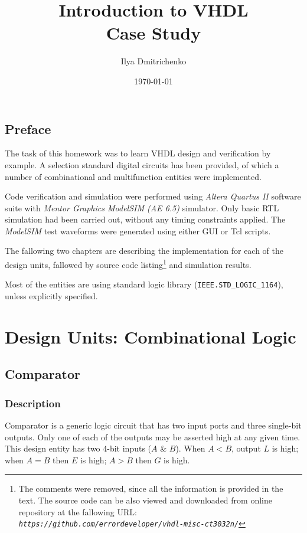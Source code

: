 \documentclass[10pt,a4paper]{report}
\author{Ilya Dmitrichenko}
\title{Introduction to VHDL \\ Case Study}
\date{\today}
\begin{document}
\maketitle

\section*{Preface}

 The task of this homework was to learn
 VHDL design and verification by example.
 A selection standard digital circuits
 has been provided, of which a number
 of combinational and multifunction
 entities were implemented.

 Code verification and simulation were
 performed using \emph{Altera Quartus II}
 software suite with \emph{Mentor Graphics
 ModelSIM (AE 6.5)} simulator.
 Only basic RTL simulation had been
 carried out, without any timing constraints
 applied. The \emph{ModelSIM} test waveforms
 were generated using either GUI or Tcl scripts.

 The fallowing two chapters are describing
 the implementation for each of the design
 units, fallowed by source code listing\footnote{
 The comments were removed, since all the
 information is provided in the text. The
 source code can be also viewed and downloaded
 from online repository at the fallowing URL: \\
 \emph{\texttt{https://github.com/errordeveloper/vhdl-misc-ct3032n/}}}
 and simulation results.

 Most of the entities are using standard
 logic library (\texttt{IEEE.STD\_LOGIC\_1164}),
 unless explicitly specified.

\tableofcontents
\listoffigures

\chapter{Design Units: Combinational Logic}

\section{Comparator}

\subsection{Description}

 Comparator is a generic logic circuit that
 has two input ports and three single-bit
 outputs. Only one of each of the outputs
 may be asserted high at any given time.
 This design entity has two 4-bit inputs
 ($A$ \& $B$). When $A < B$, output $L$
 is high; when $A = B$ then $E$ is high;
 $A > B$ then $G$ is high.
\end{document}
